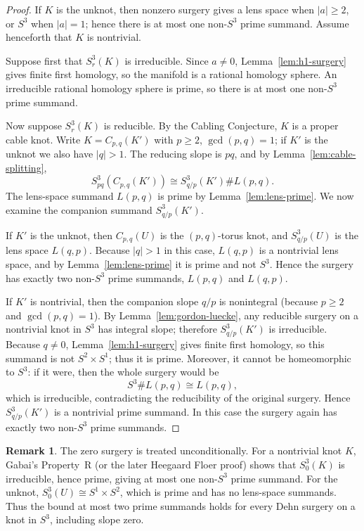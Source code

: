 \documentclass[12pt]{article}
\theoremstyle{definition}
\newtheorem{remark}[theorem]{Remark}
\begin{document}
\begin{proof}
If \(K\) is the unknot, then nonzero surgery gives a lens space when \(|a|\ge 2\), or \(S^3\) when \(|a|=1\); hence there is at most one non-\(S^3\) prime summand.  Assume henceforth that \(K\) is nontrivial.

Suppose first that \(S^3_r(K)\) is irreducible.  Since \(a\neq 0\), Lemma~\ref{lem:h1-surgery} gives finite first homology, so the manifold is a rational homology sphere.  An irreducible rational homology sphere is prime, so there is at most one non-\(S^3\) prime summand.

Now suppose \(S^3_r(K)\) is reducible.  By the Cabling Conjecture, \(K\) is a proper cable knot.  Write \(K=C_{p,q}(K')\) with \(p\ge 2\), \(\gcd(p,q)=1\); if \(K'\) is the unknot we also have \(|q|>1\).  The reducing slope is \(pq\), and by Lemma~\ref{lem:cable-splitting},
\[
S^3_{pq}(C_{p,q}(K'))\cong S^3_{q/p}(K')\# L(p,q).
\]
The lens-space summand \(L(p,q)\) is prime by Lemma~\ref{lem:lens-prime}.  We now examine the companion summand \(S^3_{q/p}(K')\).

If \(K'\) is the unknot, then \(C_{p,q}(U)\) is the \((p,q)\)-torus knot, and \(S^3_{q/p}(U)\) is the lens space \(L(q,p)\).  Because \(|q|>1\) in this case, \(L(q,p)\) is a nontrivial lens space, and by Lemma~\ref{lem:lens-prime} it is prime and not \(S^3\).  Hence the surgery has exactly two non-\(S^3\) prime summands, \(L(p,q)\) and \(L(q,p)\).

If \(K'\) is nontrivial, then the companion slope \(q/p\) is nonintegral (because \(p\ge 2\) and \(\gcd(p,q)=1\)).  By Lemma~\ref{lem:gordon-luecke}, any reducible surgery on a nontrivial knot in \(S^3\) has integral slope; therefore \(S^3_{q/p}(K')\) is irreducible.  Because \(q\neq 0\), Lemma~\ref{lem:h1-surgery} gives finite first homology, so this summand is not \(S^2\times S^1\); thus it is prime.  Moreover, it cannot be homeomorphic to \(S^3\): if it were, then the whole surgery would be
\[
S^3\# L(p,q)\cong L(p,q),
\]
which is irreducible, contradicting the reducibility of the original surgery.  Hence \(S^3_{q/p}(K')\) is a nontrivial prime summand.  In this case the surgery again has exactly two non-\(S^3\) prime summands.
\end{proof}

\begin{remark}
The zero surgery is treated unconditionally.  For a nontrivial knot \(K\), Gabai's Property~R \cite{Gabai} (or the later Heegaard Floer proof) shows that \(S^3_0(K)\) is irreducible, hence prime, giving at most one non-\(S^3\) prime summand.  For the unknot, \(S^3_0(U)\cong S^1\times S^2\), which is prime and has no lens-space summands.  Thus the bound at most two prime summands holds for every Dehn surgery on a knot in \(S^3\), including slope zero.  %
\end{remark}
\end{document}
